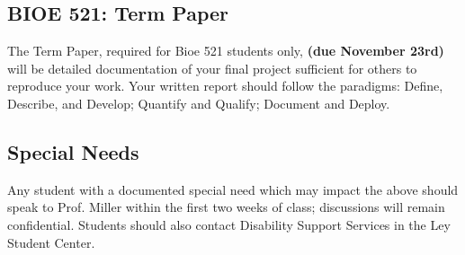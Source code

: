 \documentclass[10pt]{article}
\begin{document}
\subsection*{BIOE 521: Term Paper}
The Term Paper, required for Bioe 521 students only, \textbf{(due November 23rd)} will be detailed documentation of your final project sufficient for others to reproduce your work. Your written report should follow the paradigms: Define, Describe, and Develop; Quantify and Qualify; Document and Deploy.

\subsection*{Special Needs}
Any student with a documented special need which may impact the above should speak to Prof. Miller within the first two weeks of class; discussions will remain confidential. Students should also contact Disability Support Services in the Ley Student Center.
\end{document}
